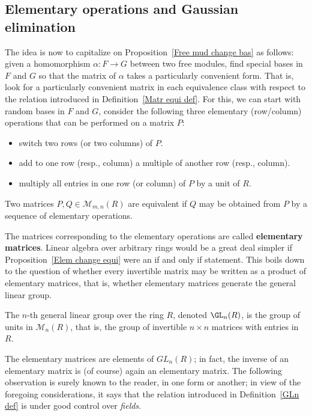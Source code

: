 \subsection{Elementary operations and Gaussian elimination}
The idea is now to capitalize on Proposition~\ref{Free mud change bas} as follows: given a homomorphism $\alpha:F\to G$ between two free modules, find special bases in $F$ and $G$ so that the matrix of $\alpha$ takes a particularly convenient form. That is, look for a particularly convenient matrix in each equivalence class with respect to the relation introduced in Definition~\ref{Matr equi def}. For this, we can start with random bases in $F$ and $G$, consider the following three elementary (row/column) operations that can be performed on a matrix $P$:
\begin{itemize}
\item switch two rows (or two columns) of $P$.
\item add to one row (resp., column) a multiple of another row (resp., column).
\item multiply all entries in one row (or column) of $P$ by a unit of $R$.
\end{itemize}
\begin{proposition}\label{Elem change equi}
Two matrices $P,Q\in\mathcal{M}_{m,n}(R)$ are equivalent if $Q$ may be obtained from $P$ by a sequence of elementary operations.
\end{proposition}
The matrices corresponding to the elementary operations are called \textbf{elementary matrices}. Linear algebra over arbitrary rings would be a great deal simpler if Proposition~\ref{Elem change equi} were an if and only if statement. This boils down to the question of whether every invertible matrix may be written as a product of elementary matrices, that is, whether elementary matrices generate the general linear group.
\begin{definition}\label{GLn def}
The $n$-th general linear group over the ring $R$, denoted $\GL_n(R)$, is the group of units in $\mathcal{M}_n(R)$, that is, the group of invertible $n\times n$ matrices with entries in $R$.
\end{definition}
The elementary matrices are elements of $GL_n(R)$; in fact, the inverse of an elementary matrix is (of course) again an elementary matrix. The following observation is surely known to the reader, in one form or another; in view of the foregoing considerations, it says that the relation introduced in Definition~\ref{GLn def} is under good control over \textit{fields}.
